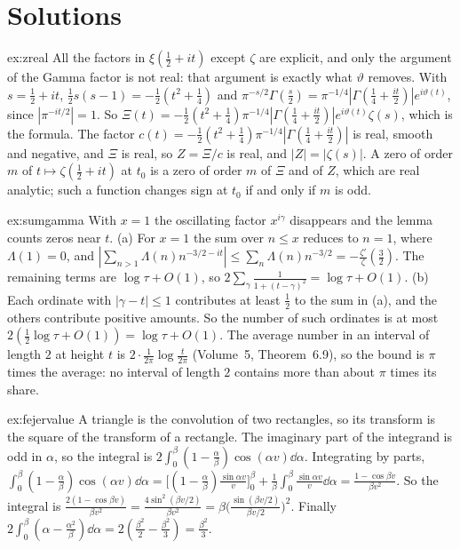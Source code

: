\section{Solutions}

\begin{solution}{ex:zreal}
\idea All the factors in $\xi(\frac12+it)$ except $\zeta$ are explicit, and only the argument of the Gamma factor is not real: that argument is exactly what $\vartheta$ removes.
\writeup With $s=\frac12+it$, $\frac12s(s-1)=-\frac12(t^2+\frac14)$ and $\pi^{-s/2}\Gamma(\frac s2)=\pi^{-1/4}|\Gamma(\frac14+\frac{it}2)|e^{i\vartheta(t)}$, since $|\pi^{-it/2}|=1$. So $\Xi(t)=-\frac12(t^2+\frac14)\pi^{-1/4}|\Gamma(\frac14+\frac{it}2)|e^{i\vartheta(t)}\zeta(s)$, which is the formula. The factor $c(t)=-\frac12(t^2+\frac14)\pi^{-1/4}|\Gamma(\frac14+\frac{it}2)|$ is real, smooth and negative, and $\Xi$ is real, so $Z=\Xi/c$ is real, and $|Z|=|\zeta(s)|$. A zero of order $m$ of $t\mapsto\zeta(\frac12+it)$ at $t_0$ is a zero of order $m$ of $\Xi$ and of $Z$, which are real analytic; such a function changes sign at $t_0$ if and only if $m$ is odd.
\end{solution}

\begin{solution}{ex:sumgamma}
\idea With $x=1$ the oscillating factor $x^{i\gamma}$ disappears and the lemma counts zeros near $t$.
\writeup (a) For $x=1$ the sum over $n\le x$ reduces to $n=1$, where $\Lambda(1)=0$, and $|\sum_{n>1}\Lambda(n)n^{-3/2-it}|\le\sum_n\Lambda(n)n^{-3/2}=-\frac{\zeta'}\zeta(\frac32)$. The remaining terms are $\log\tau+O(1)$, so $2\sum_\gamma\frac1{1+(t-\gamma)^2}=\log\tau+O(1)$.
(b) Each ordinate with $|\gamma-t|\le1$ contributes at least $\frac12$ to the sum in (a), and the others contribute positive amounts. So the number of such ordinates is at most $2(\frac12\log\tau+O(1))=\log\tau+O(1)$. The average number in an interval of length $2$ at height $t$ is $2\cdot\frac1{2\pi}\log\frac t{2\pi}$ (Volume~5, Theorem~6.9), so the bound is $\pi$ times the average: no interval of length $2$ contains more than about $\pi$ times its share.
\end{solution}

\begin{solution}{ex:fejervalue}
\idea A triangle is the convolution of two rectangles, so its transform is the square of the transform of a rectangle.
\writeup The imaginary part of the integrand is odd in $\alpha$, so the integral is $2\int_0^\beta(1-\frac\alpha\beta)\cos(\alpha v)\dd\alpha$. Integrating by parts, $\int_0^\beta(1-\frac\alpha\beta)\cos(\alpha v)\dd\alpha=\bigl[(1-\frac\alpha\beta)\frac{\sin\alpha v}v\bigr]_0^\beta+\frac1\beta\int_0^\beta\frac{\sin\alpha v}v\dd\alpha=\frac{1-\cos\beta v}{\beta v^2}$. So the integral is $\frac{2(1-\cos\beta v)}{\beta v^2}=\frac{4\sin^2(\beta v/2)}{\beta v^2}=\beta\bigl(\frac{\sin(\beta v/2)}{\beta v/2}\bigr)^2$. Finally $2\int_0^\beta(\alpha-\frac{\alpha^2}\beta)\dd\alpha=2(\frac{\beta^2}2-\frac{\beta^2}3)=\frac{\beta^2}3$.
\end{solution}

